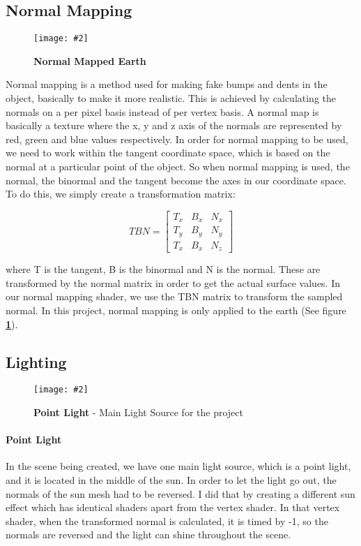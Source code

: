 \documentclass[10pt, a4paper]{article}
\newcommand{\figuremacro}[5]{
    \begin{figure}[#1]
        \centering
        \texttt{[image: \#2]}
        \caption[#3]{\textbf{#3}#4}
        \label{fig:#2}
    \end{figure}
}
\begin{document}
\subsection{Normal Mapping}
		
	\figuremacro{H}{Earth}{Normal Mapped Earth}{ }{1.0}
	
	Normal mapping is a method used for making fake bumps and dents in the object, basically to make it more realistic. This is achieved by calculating the normals on a per pixel basis instead of per vertex basis. A normal map is basically a texture  where the x, y and z axis of the normals are represented by red, green and blue values respectively. In order for normal mapping to be used, we need to work within the tangent coordinate space, which is based on the normal at a particular point of the object. So when normal mapping is used, the normal, the binormal and the tangent become the axes in our coordinate space. To do this, we simply create a transformation matrix:
	
	    \[
	    TBN=
	    \begin{bmatrix}
	    T_x & B_x & N_x  \\
	    T_y & B_y & N_y  \\
	    T_x & B_x & N_z
	    \end{bmatrix}
	    \]
	    
	where T is the tangent, B is the binormal and N is the normal. These are transformed by the normal matrix in order to get the actual surface values. In our normal mapping shader, we use the TBN matrix to transform the sampled normal. In this project, normal mapping is only applied to the earth (See figure \textbf{\ref{fig:Earth}}).
	
\subsection{Lighting}

	\figuremacro{H}{Sun}{Point Light}{ - Main Light Source for the project}{1.0}
	
	\paragraph{Point Light} In the scene being created, we have one main light source, which is a point light, and it is located in the middle of the sun. In order to let the light go out, the normals of the sun mesh had to be reversed. I did that by creating a different sun effect which has identical shaders apart from the vertex shader. In that vertex shader, when the transformed normal is calculated, it is timed by -1, so the normals are reversed and the light can shine throughout the scene.
	
\end{document}
